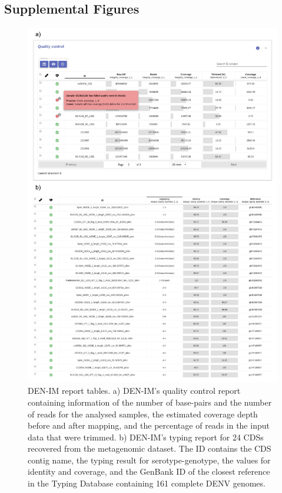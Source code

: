 \subsection{Supplemental Figures} \label{chap4_sup_figures}

\begin{figure}[h!]
\centering
\includegraphics[width=\textwidth]{figures/chapter 4/Figure S1.pdf}
\caption{DEN-IM report tables. a) DEN-IM's quality control report containing information of the number of base-pairs and the number of reads for the analysed samples, the estimated coverage depth before and after mapping, and the percentage of reads in the input data that were trimmed. b) DEN-IM's typing report for 24 CDSs recovered from the metagenomic dataset. The ID contains the CDS contig name, the typing result for serotype-genotype, the values for identity and coverage, and the GenBank ID of the closest reference in the Typing Database containing 161 complete DENV genomes.}
\label{fig:chap4_figure_sup1}
\end{figure}

